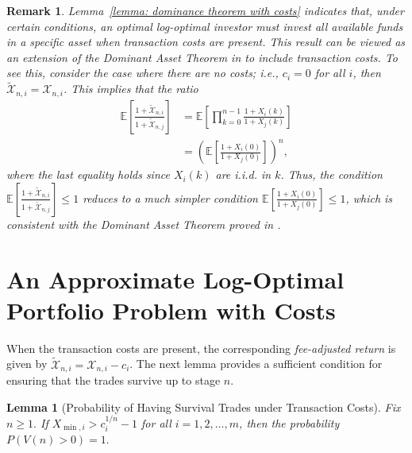 \documentclass[10pt]{article} %
\newtheorem{lemma}{Lemma}[section]
\newtheorem{remark}{Remark}[section]
\begin{document}
	\begin{remark} \rm
		Lemma~\ref{lemma: dominance theorem with costs} indicates that, under certain conditions,  an optimal log-optimal investor must invest all available funds in a specific asset when transaction costs are present.
		This result can be viewed as an extension of the Dominant Asset Theorem in \cite{hsieh2021necessary} to include transaction costs. 
		To see this, consider the case where there are no costs; i.e., $c_i = 0$ for all $i$, then $\widetilde{ \mathcal{X} }_{n,i} = \mathcal{X}_{n,i}$. This implies that the ratio
		\begin{align*}
			\mathbb{E} \left[ \frac{1+\widetilde{ \mathcal{X} }_{n,i}}{ 1 + \widetilde{\mathcal{X}}_{n,j}} \right] 
			& = \mathbb{E} \left[ \prod_{k=0}^{n-1} \frac{1+X_i(k) }{ 1+X_j(k)} \right] \\
			& = \left( \mathbb{E} \left[ \frac{1+X_i(0) }{ 1+X_j(0)} \right] \right)^n,
		\end{align*}
		where the last equality holds since $X_i(k)$ are i.i.d. in $k$.
		Thus, the condition $	\mathbb{E} \left[ \frac{ 1+\widetilde{\mathcal{X}}_{n,i}}{ 1+ \widetilde{\mathcal{X}}_{n,j}} \right] \leq 1
		$ reduces to a much simpler condition $\mathbb{E} \left[ \frac{1+X_i(0) }{ 1+X_j(0)} \right] \leq 1$, which is consistent with the Dominant Asset Theorem proved in \cite{hsieh2021necessary}.
	\end{remark}
	
	
	\section{An Approximate  Log-Optimal Portfolio Problem with Costs}\label{section: Taylor}
	When the transaction costs are present, the corresponding \textit{fee-adjusted return} is given by $ \widetilde{\mathcal{X}}_{n,i} = \mathcal{X}_{n,i} - c_i $.
	The next lemma provides a sufficient condition for ensuring that the trades survive up to stage $n$.
	
	
	
	\begin{lemma}[Probability of Having Survival Trades under Transaction Costs] \label{lemma: survival trades under costs}
		Fix $n \geq 1.$
		If ${X}_{\min,i} > c_i^{1/n}-1$ for all $i=1,2,\dots,m$, then the probability $P( V(n) > 0) =1.$
	\end{lemma}
	
\end{document}
